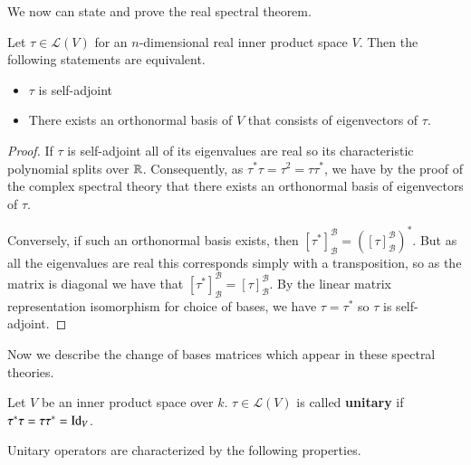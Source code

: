 We now can state and prove the real spectral theorem.

\begin{theorem}
    Let $\tau \in \mathcal{L}(V)$ for an $n$-dimensional real inner product space $V$. Then the following statements are equivalent. \begin{itemize}
        \item $\tau$ is self-adjoint
        \item There exists an orthonormal basis of $V$ that consists of eigenvectors of $\tau$.
    \end{itemize}
\end{theorem}
\begin{proof}
    If $\tau$ is self-adjoint all of its eigenvalues are real so its characteristic polynomial splits over $\mathbb R$. Consequently, as $\tau^*\tau = \tau^2 = \tau\tau^*$, we have by the proof of the complex spectral theory that there exists an orthonormal basis of eigenvectors of $\tau$.

    Conversely, if such an orthonormal basis exists, then $[\tau^*]_{\mathcal{B}}^{\mathcal{B}} = ([\tau]_{\mathcal{B}}^{\mathcal{B}})^*$. But as all the eigenvalues are real this corresponds simply with a transposition, so as the matrix is diagonal we have that $[\tau^*]_{\mathcal{B}}^{\mathcal{B}} = [\tau]_{\mathcal{B}}^{\mathcal{B}}$. By the linear matrix representation isomorphism for choice of bases, we have $\tau = \tau^*$ so $\tau$ is self-adjoint.
\end{proof}

Now we describe the change of bases matrices which appear in these spectral theories.

\begin{definition}
    Let $V$ be an inner product space over $k$. $\tau \in \mathcal{L}(V)$ is called \textbf{unitary} if $\tau^*\tau = \tau\tau^* = \operatorname{Id}_V$.
\end{definition}

Unitary operators are characterized by the following properties.

